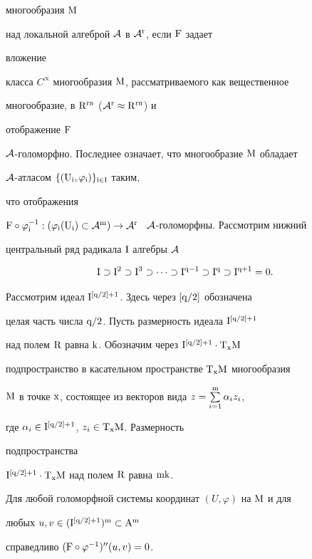 многообразия $\mathrm M$ 


над локальной алгеброй $\cal A$ в $\cal A^{\mathrm r}$, если $\mathrm F$ задает 


вложение 


класса $C^\propto$ многообразия $\mathrm M$, рассматриваемого как вещественное 


многообразие, в $\mathrm R^{\mathrm {rn}}$ ($\cal A^{\mathrm r}\approx\mathrm R^{\mathrm {rn}}$) и 


отображение $\mathrm F$ \ 


$\cal A$-голоморфно. Последнее означает, что многообразие $\mathrm M$ обладает 


$\cal A$-атласом $\{(\mathrm U_{\mathrm i},\varphi_{\mathrm i})\}_{\mathrm {i\in I}}$ таким, 


что отображения 


$\M F\circ\varphi^{-1}_{\M i}:(\varphi_{\M i}(\M U_{\M i})\subset\cal 


A^{\M m})\to\cal A^{\M r}$ \ $\cal A$-голоморфны. Рассмотрим нижний 


центральный ряд радикала $\mathrm I$ алгебры $\cal A$ 


$$ 


\M I\supset\M I^2\supset\M I^3\supset\dotsb\supset 


\M I^{\M q-1}\supset\M I^{\M q}\supset\M I^{\M{q+1}}=0. 


$$ 


 


Рассмотрим идеал $\mathrm I^{[\mathrm q/2]+1}$. Здесь через $[\mathrm q/2]$ обозначена 


целая часть числа $\mathrm q/2$. Пусть размерность идеала $\mathrm I^{[\mathrm q/2]+1}$ 


над полем $\M R$ равна $\M k$. Обозначим через $\M I^{[\M 


q/2]+1}\cdot\M T_{\M x}\M M$ 


подпространство в касательном пространстве $\mathrm T_{\mathrm x}\mathrm M$ многообразия 


$\M M$ в точке $\M x$, состоящее из векторов вида $z=\sum\limits^{\M 


m}_{i=1}\alpha_i z_i$, 


где $\alpha_i\in\mathrm I^{[\mathrm q/2]+1}$, $z_i\in\mathrm T_{\mathrm x}\mathrm M$. Размерность 


подпространства 


$\mathrm I^{[\mathrm q/2]+1}\cdot\mathrm T_{\mathrm x}\mathrm M$ над полем $\mathrm R$ равна $\mathrm{mk}$. 


 


\begin{lemnonum} 


Для любой голоморфной системы координат $(U,\varphi)$ на $\mathrm M$ и для 


любых $u,v\in(\mathrm I^{[\mathrm q/2]+1})^{\mathrm m}\subset\mathrm A^{\mathrm m}$ 


справедливо $(\mathrm F\circ\varphi^{-1})''(u,v)=0$. 


\end{lemnonum} 


